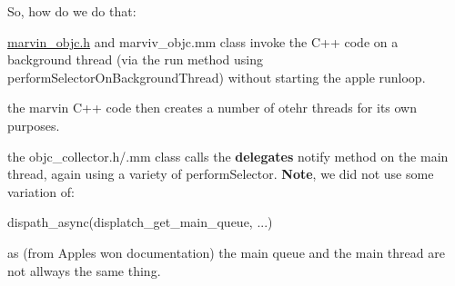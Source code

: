 So, how do we do that\+:


\begin{DoxyItemize}
\item {\ttfamily \hyperlink{marvin__objc_8h_source}{marvin\+\_\+objc.\+h}} and {\ttfamily marviv\+\_\+objc.\+mm} class invoke the C++ code on a background thread (via the {\ttfamily run} method using {\ttfamily perform\+Selector\+On\+Background\+Thread}) without starting the apple runloop.
\item the marvin C++ code then creates a number of otehr threads for its own purposes.
\item the {\ttfamily objc\+\_\+collector.\+h/.mm} class calls the {\bfseries delegates} {\ttfamily notify} method on the main thread, again using a variety of {\ttfamily perform\+Selector}. {\bfseries Note}, we did not use some variation of\+:
\end{DoxyItemize}


\begin{DoxyCode}
dispath\_async(displatch\_get\_main\_queue, ...)
\end{DoxyCode}


as (from Apples won documentation) the main queue and the main thread are not allways the same thing. 